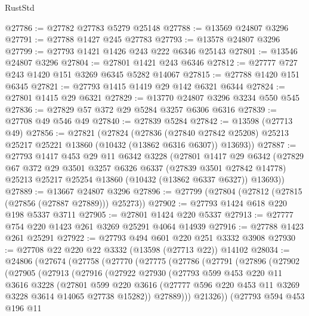 \begin{lexlean}{RustStd}
\begin{coremodule}
@27786 := @27782 @27783 @5279 @25148
@27788 := @13569 @24807 @3296
@27791 := @27788 @1427 @245 @27783
@27793 := @13578 @24807 @3296
@27799 := @27793 @1421 @1426 @243 @222 @6346 @25143
@27801 := @13546 @24807 @3296
@27804 := @27801 @1421 @243 @6346
@27812 := @27777 @727 @243 @1420 @151 @3269 @6345 @5282 @14067
@27815 := @27788 @1420 @151 @6345
@27821 := @27793 @1415 @1419 @29 @142 @6321 @6344
@27824 := @27801 @1415 @29 @6321
@27829 := @13770 @24807 @3296 @3234 @550 @545
@27836 := @27829 @57 @372 @29 @5284 @3257 @6306 @6316
@27839 := @27708 @49 @546 @49
@27840 := @27839 @5284
@27842 := @13598 (@27713 @49)
@27856 := @27821
    (@27824
      (@27836
        (@27840 @27842 @25208)
        @25213
        @25217
        @25221
        @13860
        (@10432 (@13862 @6316 @6307))
        @13693))
@27887 := @27793
    @1417
    @453
    @29
    @11
    @6342
    @3228
    (@27801
      @1417
      @29
      @6342
      (@27829
        @67
        @372
        @29
        @3501
        @3257
        @6326
        @6337
        (@27839 @3501 @27842 @14778)
        @25213
        @25217
        @25254
        @13860
        (@10432 (@13862 @6337 @6327))
        @13693))
@27889 := @13667 @24807 @3296
@27896 := @27799 (@27804 (@27812 (@27815 (@27856 (@27887 @27889))) @25273))
@27902 := @27793 @1424 @618 @220 @198 @5337 @3711
@27905 := @27801 @1424 @220 @5337
@27913 := @27777 @754 @220 @1423 @261 @3269 @25291 @4064 @14939
@27916 := @27788 @1423 @261 @25291
@27922 := @27793 @494 @601 @220 @251 @3332 @3908
@27930 := @27708 @22 @220 @22 @3332 (@13598 (@27713 @22)) @14102
@28034 := @24806
    (@27674
      (@27758
        (@27770
          (@27775
            (@27786
              (@27791
                (@27896
                  (@27902
                    (@27905
                      (@27913
                        (@27916
                          (@27922
                            @27930
                            (@27793
                              @599
                              @453
                              @220
                              @11
                              @3616
                              @3228
                              (@27801
                                @599
                                @220
                                @3616
                                (@27777 @596 @220 @453 @11 @3269 @3228 @3614 @14065 @27738 @15282))
                              @27889)))
                        @21326))
                    (@27793
                      @594
                      @453
                      @196
                      @11

\end{coremodule}
\end{lexlean}
